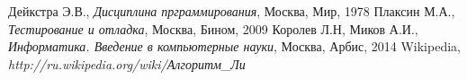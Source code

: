 \begin{thebibliography}{99}
  Дейкстра Э.В.,
  \emph{Дисциплина прграммирования},
  Москва, Мир,
  1978
  Плаксин М.А.,
  \emph{Тестирование и отладка},
  Москва, Бином,
  2009
  Королев Л.Н, Миков А.И.,
  \emph{Информатика. Введение в компьютерные науки},
  Москва, Арбис,
  2014
  Wikipedia,
  \emph{http://ru.wikipedia.org/wiki/Алгоритм\_Ли}
\end{thebibliography}
\pagebreak
